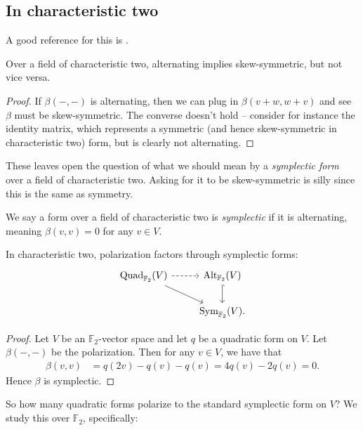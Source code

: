 \documentclass[11pt]{amsart}
\providecommand{\Alt}{\mathrm{Alt}}
\providecommand{\Quad}{\mathrm{Quad}}
\begin{document}
\subsection{In characteristic two}
A good reference for this is \cite[5.1.2]{Dolgachev}.

\begin{proposition} Over a field of characteristic two, alternating implies skew-symmetric, but not vice versa.
\end{proposition}
\begin{proof} If $\beta(-,-)$ is alternating, then we can plug in $\beta(v+w,w+v)$ and see $\beta$ must be skew-symmetric. The converse doesn't hold -- consider for instance the identity matrix, which represents a symmetric (and hence skew-symmetric in characteristic two) form, but is clearly not alternating.
\end{proof}

These leaves open the question of what we should mean by a \textit{symplectic form} over a field of characteristic two. Asking for it to be skew-symmetric is silly since this is the same as symmetry.

\begin{definition} We say a form over a field of characteristic two is \textit{symplectic} if it is alternating, meaning $\beta(v,v) = 0$ for any $v\in V$.
\end{definition}


\begin{proposition} In characteristic two, polarization factors through symplectic forms:
\[ \begin{tikzcd}
    \Quad_{\mathbb{F}_2}(V)\ar[dr]\rar[dashed] & \Alt_{\mathbb{F}_2}(V)\dar[hook]\\
     & \Sym_{\mathbb{F}_2}(V).
\end{tikzcd} \]
\end{proposition}
\begin{proof} Let $V$ be an $\mathbb{F}_2$-vector space and let $q$ be a quadratic form on $V$. Let $\beta(-,-)$ be the polarization. Then for any $v\in V$, we have that
\begin{align*}
    \beta(v,v) &= q(2v) - q(v) - q(v) = 4q(v) - 2q(v) =0.
\end{align*}
Hence $\beta$ is symplectic.
\end{proof}

So how many quadratic forms polarize to the standard symplectic form on $V$? We study this over $\mathbb{F}_2$, specifically:
\end{document}
